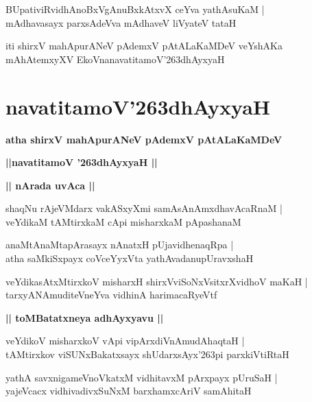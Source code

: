 \documentclass[twoside,12pt,openright]{book}
\def\S{\char'263}
\newcounter{shloka}[chapter]
\def\uvaca#1{\centerline{{\large\textbf{#1}}}}
\begin{document}
\begin{shloka}%
BUpativiRvidhAnoBxVgAnuBxkAtxvX ceYva yathAsuKaM |\\
mAdhavasayx parxsAdeVva mAdhaveV liVyateV tataH 
\end{shloka}

\begin{center}
iti shirxV mahApurANeV pAdemxV pAtALaKaMDeV veYshAKa mAhAtemxyXV 
EkoVnanavatitamoV\S dhAyxyaH
\end{center}

\chapter{navatitamoV\S dhAyxyaH}

\begin{center}
{\LARGE\bfseries atha shirxV mahApurANeV pAdemxV pAtALaKaMDeV }
\end{center}

\begin{center}         
{\LARGE\bfseries ||navatitamoV \S dhAyxyaH ||}
\end{center}

\uvaca{|| nArada uvAca ||}

\begin{shloka}%
shaqNu rAjeVMdarx vakASxyXmi samAsAnAmxdhavAcaRnaM |\\
veYdikaM tAMtirxkaM cApi misharxkaM pApashanaM 
\end{shloka}

\begin{shloka}%
anaMtAnaMtapArasayx nAnatxH pUjavidhenaqRpa |\\
atha saMkiSxpayx coVceYyxVta yathAvadanupUravxshaH 
\end{shloka}

\begin{shloka}%
veYdikasAtxMtirxkoV misharxH shirxVviSoNxVsitxrXvidhoV maKaH |\\
tarxyANAmuditeVneYva vidhinA harimacaRyeVtf 
\end{shloka}

\uvaca{|| toMBatatxneya adhAyxyavu ||}

\begin{shloka}%
veYdikoV misharxkoV vApi vipArxdiVnAmudAhaqtaH |\\
tAMtirxkov viSUNxBakatxsayx shUdarxsAyx\S pi parxkiVtiRtaH 
\end{shloka}

\begin{shloka}%
yathA savxnigameVnoVkatxM vidhitavxM pArxpayx pUruSaH |\\
yajeVcacx vidhivadivxSuNxM barxhamxcAriV samAhitaH 
\end{shloka}
\end{document}
